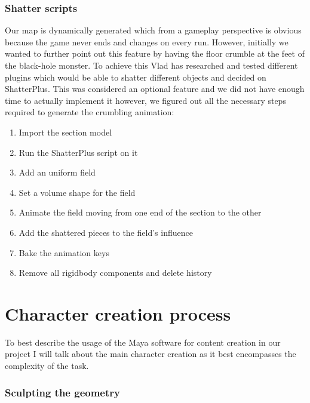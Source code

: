 \documentclass[a4paper,oneside]{memoir}
\begin{document}
                \subsubsection{Shatter scripts}
                
                    Our map is dynamically generated which from a gameplay perspective is obvious because the game never ends and changes on every run. However, initially we wanted to further point out this feature by having the floor crumble at the feet of the black-hole monster. To achieve this Vlad has researched and tested different plugins which would be able to shatter different objects and decided on ShatterPlus. This was considered an optional feature and we did not have enough time to actually implement it however, we figured out all the necessary steps required to generate the crumbling animation: 
                    
                    \begin{enumerate}
	                    \item Import the section model
	                    \item Run the ShatterPlus script on it
	                    \item Add an uniform field
	                    \item Set a volume shape for the field
	                    \item Animate the field moving from one end of the section to the other
	                    \item Add the shattered pieces to the field's influence
	                    \item Bake the animation keys
	                    \item Remove all rigidbody components and delete history
                    \end{enumerate}
            
            \section{Character creation process}
                
                To best describe the usage of the Maya software for content creation in our project I will talk about the main character creation as it best encompasses the complexity of the task.
                
            \subsubsection{Sculpting the geometry}
            
\end{document}
